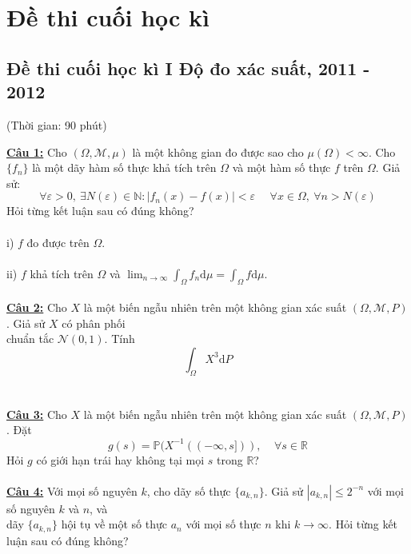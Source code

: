 \documentclass[10pt, a4paper]{article}
\begin{document}
\newpage

\section{Đề thi cuối học kì}
\subsection{Đề thi cuối học kì I Độ đo xác suất, 2011 - 2012}
\begin{center}
	\color{blue}(Thời gian: 90 phút)
\end{center}
\color{red}\underline{\textbf{Câu 1:}} \color{black}Cho $(\Omega,\mathcal M,\mu)$ là một không gian đo được sao cho $\mu(\Omega)<\infty$. Cho $\{f_n\}$ là một dãy hàm số thực khả tích trên $\Omega$ và một hàm số thực $f$ trên $\Omega$. Giả sử: $$\forall\varepsilon>0,~\exists N(\varepsilon)\in\mathbb N:|f_n(x)-f(x)|<\varepsilon~~~~~~\forall x\in\Omega,~\forall n>N(\varepsilon)$$
Hỏi từng kết luận sau có đúng không?\\\\
\color{red}i) \color{black}$f$ đo được trên $\Omega$.\\\\
\color{red}ii) \color{black}$f$ khả tích trên $\Omega$ và $\displaystyle\lim_{n\rightarrow\infty}\displaystyle\int_\Omega f_n\text{d}\mu=\displaystyle\int_\Omega f\text{d}\mu$.\\\\
\color{red}\underline{\textbf{Câu 2:}} \color{black}Cho $X$ là một biến ngẫu nhiên trên một không gian xác suất $(\Omega,\mathcal M,P)$. Giả sử $X$ có phân phối\\ chuẩn tắc $\mathcal N(0,1)$. Tính $$\displaystyle\int_\Omega X^3\text{d}P$$\\\\
\color{red}\underline{\textbf{Câu 3:}} \color{black}Cho $X$ là một biến ngẫu nhiên trên một không gian xác suất $(\Omega,\mathcal M,P)$. Đặt $$g(s)=\mathbb P(X^{-1}((-\infty,s])),~~~~~\forall s\in\mathbb R$$
Hỏi $g$ có giới hạn trái hay không tại mọi $s$ trong $\mathbb R$?\\\\
\color{red}\underline{\textbf{Câu 4:}} \color{black}Với mọi số nguyên $k$, cho dãy số thực $\{a_{k,n}\}$. Giả sử $|a_{k,n}|\le2^{-n}$ với mọi số nguyên $k$ và $n$, và\\ dãy $\{a_{k,n}\}$ hội tụ về một số thực $a_n$ với mọi số thực $n$ khi $k\rightarrow\infty$. Hỏi từng kết luận sau có đúng không?\\\\
\end{document}
